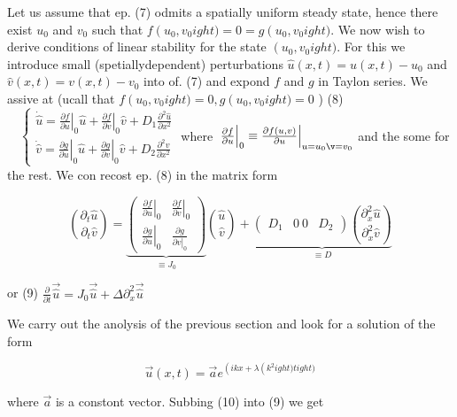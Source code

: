 Let us assume that ep. (7) odmits a spatially uniform steady state, hence there exist $u_{0}$ and $v_{0}$ such that $f
\left(u_{0}, v_{0}
ight)=0=g
\left(u_{0}, v_{0}
ight)$. We now wish to derive conditions of linear stability for the state $\left(u_{0}, v_{0}
ight)$. For this we introduce small (spetiallydependent) perturbations $\hat{u}(x, t)=u(x, t)-u_{0}$ and $\hat{v}(x, t)=v(x, t)-v_{0}$ into of. (7) and expond $f$ and $g$ in Taylon series. We assive at (ucall that $f
\left(u_{0}, v_{0}
ight)=0, g
\left(u_{0}, v_{0}
ight)=0$ )
(8) $\quad\left\{
\begin{array}{l}\dot{\hat{u}}=\left.\frac{\partial f}{\partial u}\right|_{0} \hat{u}+\left.\frac{\partial f}{\partial v}\right|_{0} \hat{v}+D_{1} \frac{\partial^{2} \hat{u}}{\partial x^{2}} \\ 
\dot{\hat{v}}=\left.\frac{\partial g}{\partial u}\right|_{0} \hat{u}+\left.\frac{\partial g}{\partial v}\right|_{0} \hat{v}+D_{2} \frac{\partial^{2} \hat{v}}{\partial x^{2}}\end{array}\right.$
where $\left.\left.\frac{\partial f}{\partial u}\right|_{0} \equiv \frac{\partial f(u, v)}{\partial u}\right|_{\substack{u=u_{0} \v=v_{0}}}$ and the some for the rest. We con recost ep. (8) in the matrix form

$$ 
\binom{\partial_{t} \hat{u}}{\partial_{t} \hat{v}}=\underbrace{\left(\begin{array}{cc}
\left.\frac{\partial f}{\partial u}\right|_{0} & \left.\frac{\partial f}{\partial v}\right|_{0} \\ 
\left.\frac{\partial g}{\partial u}\right|_{0} & \frac{\partial g}{\left.\partial v\right|_{0}}\end{array}\right)}_{\equiv J_{0}}\binom{\hat{u}}{\hat{v}}+\underbrace{\left(\begin{array}{cc}
D_{1} & 0 \ 
0 & D_{2}\end{array}\right)\binom{\partial_{x}^{2} \hat{u}}{\partial_{x}^{2} \hat{v}}}_{\equiv D}
$$

or
(9) $\frac{\partial}{\partial t} \overrightarrow{\hat{u}}=J_{0} \overrightarrow{\hat{u}}+\Delta \partial_{x}^{2} \overrightarrow{\hat{u}}$

We carry out the anolysis of the previous section and look for a solution of the form


\begin{equation*} 
\vec{u}(x, t)=\vec{a} e^{\left(i k x+\lambda
\left(k^{2}
ight) t
ight)} \tag{10}
\end{equation*} 

where $\vec{a}$ is a constont vector. Subbing (10) into (9) we get

